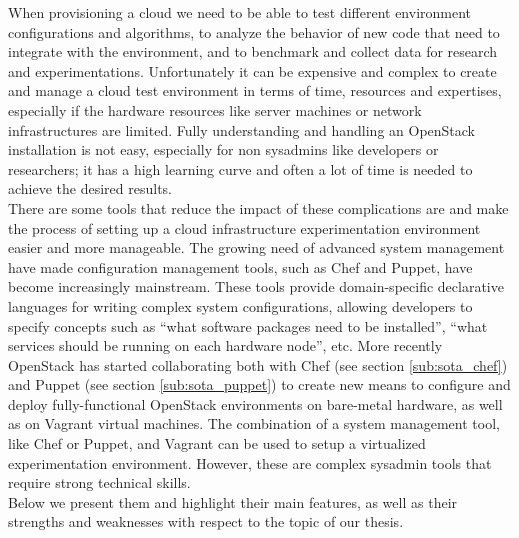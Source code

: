 When provisioning a cloud we need to be able to test different environment configurations and algorithms, to analyze the behavior of new code that need to integrate with the environment, and to benchmark and collect data for research and experimentations. Unfortunately it can be expensive and complex to create and manage a cloud test environment in terms of time, resources and expertises, especially if the hardware resources like server machines or network infrastructures are limited. Fully understanding and handling an OpenStack installation is not easy, especially for non sysadmins like developers or researchers; it has a high learning curve and often a lot of time is needed to achieve the desired results.\\
There are some tools that reduce the impact of these complications are and make the process of setting up a cloud infrastructure experimentation environment easier and more manageable.
The growing need of advanced system management have made configuration management tools, such as Chef and Puppet, have become increasingly mainstream. These tools provide domain-specific declarative languages for writing complex system configurations, allowing developers to specify concepts such as ``what software packages need to be installed'', ``what services should be running on each hardware node'', etc. More recently OpenStack has started collaborating both with Chef (see section \ref{sub:sota_chef}) and Puppet (see section \ref{sub:sota_puppet}) to create new means to configure and deploy fully-functional OpenStack environments on bare-metal hardware, as well as on Vagrant virtual machines. The combination of a system management tool, like Chef or Puppet, and Vagrant can be used to setup a virtualized experimentation environment. However, these are complex sysadmin tools that require strong technical skills.\\
Below we present them and highlight their main features, as well as their strengths and weaknesses with respect to the topic of our thesis.

